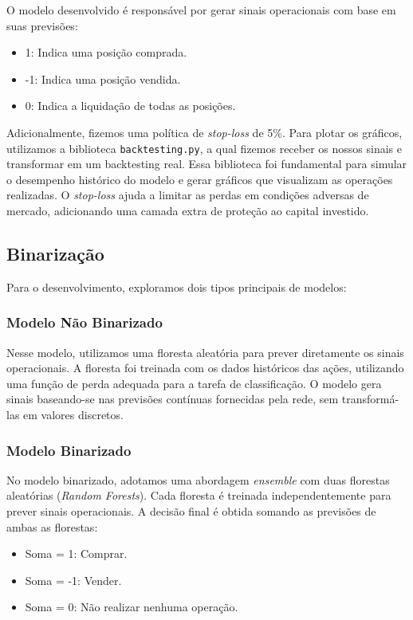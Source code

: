 \documentclass{article}
\begin{document}
O modelo desenvolvido é responsável por gerar sinais operacionais com base em suas previsões:
\begin{itemize}
    \item 1: Indica uma posição comprada.
    \item -1: Indica uma posição vendida.
    \item 0: Indica a liquidação de todas as posições.
\end{itemize}

Adicionalmente, fizemos uma política de \textit{stop-loss} de 5\%. Para plotar os gráficos, utilizamos a biblioteca \texttt{backtesting.py}, a qual fizemos receber os nossos sinais e transformar em um backtesting real. Essa biblioteca foi fundamental para simular o desempenho histórico do modelo e gerar gráficos que visualizam as operações realizadas. O \textit{stop-loss} ajuda a limitar as perdas em condições adversas de mercado, adicionando uma camada extra de proteção ao capital investido.

\subsection{Binarização}

Para o desenvolvimento, exploramos dois tipos principais de modelos:

\subsubsection{Modelo Não Binarizado}

Nesse modelo, utilizamos uma floresta aleatória para prever diretamente os sinais operacionais. A floresta foi treinada com os dados históricos das ações, utilizando uma função de perda adequada para a tarefa de classificação. O modelo gera sinais baseando-se nas previsões contínuas fornecidas pela rede, sem transformá-las em valores discretos.

\subsubsection{Modelo Binarizado}

No modelo binarizado, adotamos uma abordagem \textit{ensemble} com duas florestas aleatórias (\textit{Random Forests}). Cada floresta é treinada independentemente para prever sinais operacionais. A decisão final é obtida somando as previsões de ambas as florestas:
\begin{itemize}
    \item Soma = 1: Comprar.
    \item Soma = -1: Vender.
    \item Soma = 0: Não realizar nenhuma operação.
\end{itemize}
\end{document}
